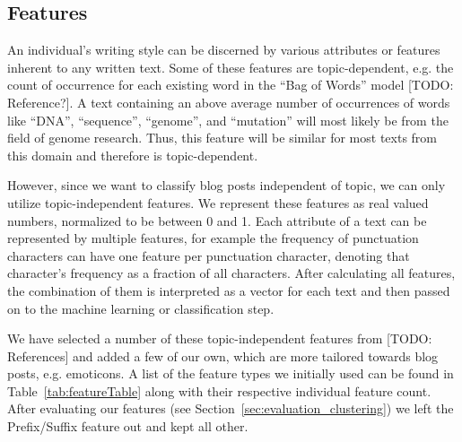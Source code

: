 \subsection{Features}
\label{sec:features}

An individual's writing style can be discerned by various attributes or features inherent to any written text.
Some of these features are topic-dependent, e.g. the count of occurrence for each existing word in the “Bag of Words” model [TODO: Reference?].
A text containing an above average number of occurrences of words like “DNA”, “sequence”, “genome”, and “mutation” will most likely be from the field of genome research.
Thus, this feature will be similar for most texts from this domain and therefore is topic-dependent.


However, since we want to classify blog posts independent of topic, we can only utilize topic-independent features.
We represent these features as real valued numbers, normalized to be between 0 and 1.
Each attribute of a text can be represented by multiple features, for example the frequency of punctuation characters can have one feature per punctuation character, denoting that character's frequency as a fraction of all characters.
After calculating all features, the combination of them is interpreted as a vector for each text and then passed on to the machine learning or classification step.


We have selected a number of these topic-independent features from [TODO: References] and added a few of our own, which are more tailored towards blog posts, e.g. emoticons.
A list of the feature types we initially used can be found in Table~\ref{tab:featureTable} along with their respective individual feature count.
After evaluating our features (see Section~\ref{sec:evaluation_clustering}) we left the Prefix/Suffix feature out and kept all other.



